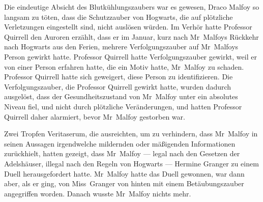 Die eindeutige Absicht des Blutkühlungszaubers war es gewesen, Draco Malfoy so langsam zu töten, dass die Schutzzauber von Hogwarts, die auf plötzliche Verletzungen eingestellt sind, nicht auslösen würden. Im Verhör hatte Professor Quirrell den Auroren erzählt, dass er im Januar, kurz nach Mr~Malfoys Rückkehr nach Hogwarts aus den Ferien, mehrere Verfolgungszauber auf Mr~Malfoys Person gewirkt hatte. Professor Quirrell hatte Verfolgungszauber gewirkt, weil er von einer Person erfahren hatte, die ein Motiv hatte, Mr~Malfoy zu schaden. Professor Quirrell hatte sich geweigert, diese Person zu identifizieren. Die Verfolgungszauber, die Professor Quirrell gewirkt hatte, wurden dadurch ausgelöst, dass der Gesundheitszustand von Mr~Malfoy unter ein absolutes Niveau fiel, und nicht durch plötzliche Veränderungen, und hatten Professor Quirrell daher alarmiert, bevor Mr~Malfoy gestorben war.

Zwei Tropfen Veritaserum, die ausreichten, um zu verhindern, dass Mr~Malfoy in seinen Aussagen irgendwelche mildernden oder mäßigenden Informationen zurückhielt, hatten gezeigt, dass Mr~Malfoy — legal nach den Gesetzen der Adelshäuser, illegal nach den Regeln von Hogwarts — Hermine Granger zu einem Duell herausgefordert hatte. Mr~Malfoy hatte das Duell gewonnen, war dann aber, als er ging, von Miss~Granger von hinten mit einem Betäubungszauber angegriffen worden. Danach wusste Mr~Malfoy nichts mehr.

